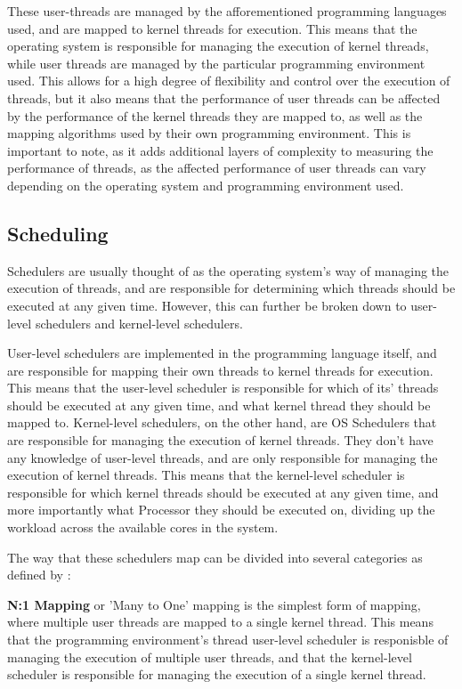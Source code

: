 \documentclass[12pt,a4paper]{article}
\begin{document}
These user-threads are managed by the afforementioned programming languages used, and are mapped to kernel threads for execution. This means that the operating system is responsible for managing the execution of kernel threads, while user threads are managed by the particular programming environment used. This allows for a high degree of flexibility and control over the execution of threads, but it also means that the performance of user threads can be affected by the performance of the kernel threads they are mapped to, as well as the mapping algorithms used by their own programming environment. This is important to note, as it adds additional layers of complexity to measuring the performance of threads, as the affected performance of user threads can vary depending on the operating system and programming environment used.

\subsection{Scheduling}

Schedulers are usually thought of as the operating system's way of managing the execution of threads, and are responsible for determining which threads should be executed at any given time. However, this can further be broken down to user-level schedulers and kernel-level schedulers\parencite[pp. 154-155]{Rauber2023}.

User-level schedulers are implemented in the programming language itself, and are responsible for mapping their own threads to kernel threads for execution. This means that the user-level scheduler is responsible for which of its' threads should be executed at any given time, and what kernel thread they should be mapped to. Kernel-level schedulers, on the other hand, are OS Schedulers that are responsible for managing the execution of kernel threads\parencite[pp. 155-156]{Rauber2023}. They don't have any knowledge of user-level threads, and are only responsible for managing the execution of kernel threads. This means that the kernel-level scheduler is responsible for which kernel threads should be executed at any given time, and more importantly what Processor they should be executed on, dividing up the workload across the available cores in the system. 

The way that these schedulers map can be divided into several categories as defined by \citeauthor[pp. 155-156]{Rauber2023}:

\textbf{N:1 Mapping} or 'Many to One' mapping is the simplest form of mapping, where multiple user threads are mapped to a single kernel thread. This means that the programming environment's thread user-level scheduler is responisble of managing the execution of multiple user threads, and that the kernel-level scheduler is responsible for managing the execution of a single kernel thread.
\end{document}
